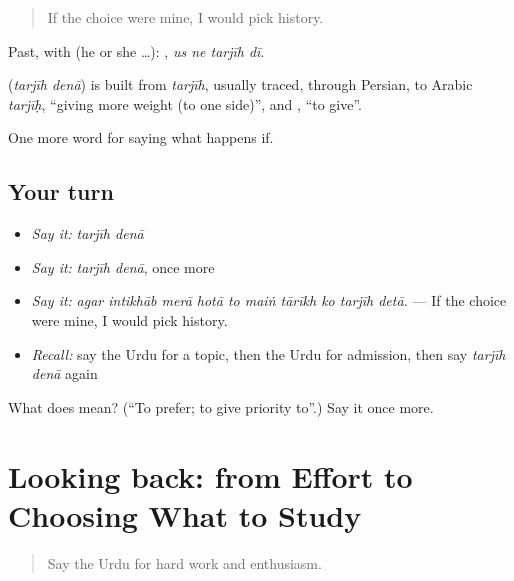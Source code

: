 \begin{quote}
If the choice were mine, I would pick history.
\end{quote}

Past, with  (he or she …):    , \emph{us ne tarjīh dī}.

\begin{cousinweb}
\textbf{ } (\emph{tarjīh denā}) is built from \emph{tarjīh}, usually traced, through Persian, to Arabic \emph{tarjīḥ}, \textquotedblleft{}giving more weight (to one side)\textquotedblright{}, and \textbf{}, \textquotedblleft{}to give\textquotedblright{}.
\end{cousinweb}

\begin{grammarlens}[title={What you've built}]
One more word for saying what happens if.
\end{grammarlens}

\subsection*{Your turn}
\begin{itemize}
\raggedright
  \item \emph{Say it:} \emph{tarjīh denā}
  \item \emph{Say it:} \emph{tarjīh denā}, once more
  \item \emph{Say it:} \emph{agar intikhāb merā hotā to maiṅ tārīkh ko tarjīh detā.} — If the choice were mine, I would pick history.
  \item \emph{Recall:} say the Urdu for a topic, then the Urdu for admission, then say \emph{tarjīh denā} again
\end{itemize}

\begin{tcolorbox}[breakable,colback=teal!4,colframe=teal!35!black,title={Before you move on}]
What does   mean? (\textquotedblleft{}To prefer; to give priority to\textquotedblright{}.) Say it once more.
\end{tcolorbox}
\section[(dialogue)]{Looking back: from Effort to Choosing What to Study}

\label{lesson:UR-R385-review-379-385}



\begin{quote}
Say the Urdu for hard work and enthusiasm.
\end{quote}

